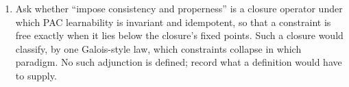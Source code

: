 \begin{enumerate}[leftmargin=*,itemsep=3pt]
\item Ask whether ``impose consistency and properness'' is a closure operator under which PAC learnability is invariant and idempotent, so that a constraint is free exactly when it lies below the closure's fixed points. Such a closure would classify, by one Galois-style law, which constraints collapse in which paradigm. No such adjunction is defined; record what a definition would have to supply.
\end{enumerate}
